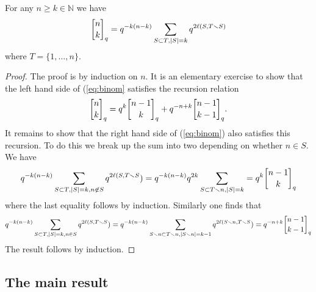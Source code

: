 \documentclass[11pt]{amsart}
\begin{document}
\begin{lem}\label{lem:binom}
For any $n \ge k \in {\mathbb N}$ we have 
\begin{equation}\label{eq:binom}
\qBinomial{n}{k} = q^{-k(n-k)} \sum_{S \subset T, |S|=k} q^{2 \ell(S, T \smallsetminus S)}
\end{equation}
where $T = \{1, \dots, n\}$. 
\end{lem}
\begin{proof}
The proof is by induction on $n$. It is an elementary exercise to show that the left hand side of (\ref{eq:binom} satisfies the recursion relation 
$$\qBinomial{n}{k} = q^k \qBinomial{n-1}{k} + q^{-n+k} \qBinomial{n-1}{k-1}.$$
It remains to show that the right hand side of (\ref{eq:binom}) also satisfies this recursion. To do this we break up the sum into two depending on whether $n \in S$. We have
$$q^{-k(n-k)} \sum_{S \subset T, |S|=k, n \not\in S} q^{2 \ell(S, T \smallsetminus S}) = q^{-k(n-k)} q^{2k} \sum_{S \subset T \smallsetminus n, |S|=k} = q^k \qBinomial{n-1}{k}$$
where the last equality follows by induction. Similarly one finds that 
$$q^{-k(n-k)} \sum_{S \subset T, |S|=k, n \in S} q^{2 \ell(S, T \smallsetminus S}) = q^{-k(n-k)} \sum_{S \smallsetminus n \subset T \smallsetminus n, |S \smallsetminus n| = k-1} q^{2 \ell(S \smallsetminus n, T \smallsetminus S}) = q^{-n+k} \qBinomial{n-1}{k-1}$$
The result follows by induction. 
\end{proof}

\subsection{The main result}\label{sec:main}
\end{document}
